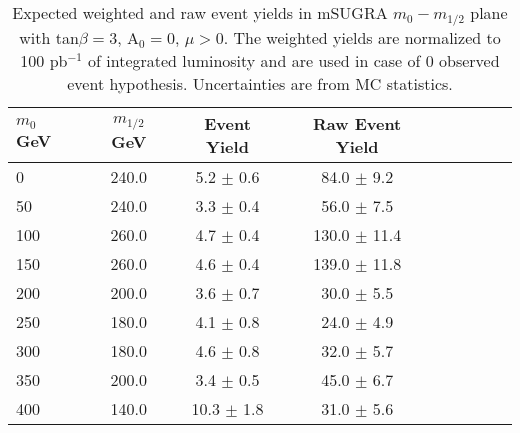 \label{sec:tables}

\vspace{10 mm}
\begin{table}[hbt]
\begin{center}
\renewcommand{\arraystretch}{2.0}
 {\footnotesize
\begin{tabular}{|l|c|c|c|c|c|c|c|c|}\hline
$m_{0}$ GeV & $m_{1/2}$ GeV & Event Yield & Raw Event Yield \\ \hline
0 & 240.0 & 5.2 $\pm$ 0.6 & 84.0 $\pm$ 9.2 \\ 
50 & 240.0 & 3.3 $\pm$ 0.4 & 56.0 $\pm$ 7.5 \\ 
100 & 260.0 & 4.7 $\pm$ 0.4 & 130.0 $\pm$ 11.4 \\ 
150 & 260.0 & 4.6 $\pm$ 0.4 & 139.0 $\pm$ 11.8 \\ 
200 & 200.0 & 3.6 $\pm$ 0.7 & 30.0 $\pm$ 5.5 \\ 
250 & 180.0 & 4.1 $\pm$ 0.8 & 24.0 $\pm$ 4.9 \\ 
300 & 180.0 & 4.6 $\pm$ 0.8 & 32.0 $\pm$ 5.7 \\ 
350 & 200.0 & 3.4 $\pm$ 0.5 & 45.0 $\pm$ 6.7 \\ 
400 & 140.0 & 10.3 $\pm$ 1.8 & 31.0 $\pm$ 5.6 \\ \hline
\end{tabular} }
\caption{Expected weighted and raw event yields in mSUGRA $m_{0}-m_{1/2}$ plane with tan$\beta = 3$, A$_0 = 0$, $\mu > 0$. The weighted yields are normalized to 100 pb$^{-1}$ of integrated luminosity and are used in case of 0 observed event hypothesis. Uncertainties are from MC statistics. \label{tab:ssyields_ex0}}
\end{center}
\end{table}

